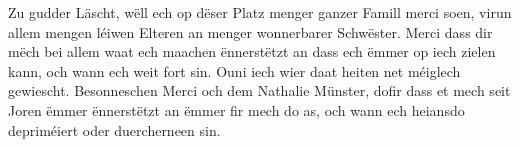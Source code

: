 \begin{acknowledgements}[Acknowledgements]
Zu gudder Läscht, wëll ech op dëser Platz menger ganzer Famill merci soen, virun allem mengen léiwen Elteren an menger wonnerbarer Schwëster. Merci dass dir mëch bei allem waat ech maachen ënnerstëtzt an dass ech ëmmer op iech zielen kann, och wann ech weit fort sin. Ouni iech wier daat heiten net méiglech gewiescht. Besonneschen Merci och dem Nathalie Münster, dofir dass et mech seit Joren ëmmer ënnerstëtzt an ëmmer fir mech do as, och wann ech heiansdo depriméiert oder duercherneen sin.
\end{acknowledgements}
